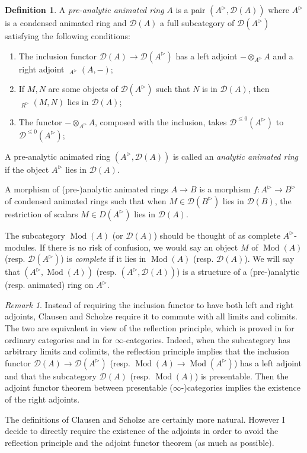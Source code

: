 \documentclass{article}
\theoremstyle{plain}
\theoremstyle{definition}
\newtheorem{defi}[thm]{Definition}
\theoremstyle{remark}
\newtheorem{rmk}[thm]{Remark}
\DeclareMathOperator{\Homs}{\underline{Hom}}
\DeclareMathOperator{\rhoms}{\underline{RHom}}
\DeclareMathOperator{\modcat}{Mod}
\newcommand{\huflag}{\triangleright}
\newcommand{\D}{\mathcal{D}}
\newcommand{\resp}[1]{{\color{respcolor}(resp. #1)}}
\begin{document}
\begin{defi}
A \emph{pre-analytic animated ring} $ A $ is a pair $ (A ^{\huflag}, \D(A)) $ where $ A ^{\huflag} $ is a condensed animated ring and
$ \D (A) $ a full subcategory of $ \D (A ^{\huflag}) $ satisfying the following conditions:

\begin{enumerate}
\item The inclusion functor $ \D (A)\to \D (A ^{\huflag}) $ has a left adjoint $ -\otimes _{A ^{\huflag}} A $
and a right adjoint $ \Homs _{A ^{\huflag}}(A, -) $;
\item If $ M,N $ are some objects of $ \D (A ^{\huflag}) $ such that $ N $ is in $\D (A) $, then $ \rhoms _{R ^{\huflag}} (M, N) $ lies in $ \D (A) $;
\item The functor $ -\otimes _{A ^{\huflag}} A $, composed with the inclusion, takes $ \D ^{\leq 0}(A ^{\huflag}) $ to $ \D ^{\leq 0}(A ^{\huflag}) $;
\end{enumerate}
A pre-analytic animated ring $ (A ^{\huflag}, \D (A)) $ is called an \emph{analytic animated ring} if
the object $ A ^{\huflag} $ lies in $ \D (A) $.

A morphism of (pre-)analytic animated rings $ A\to B $ is a morphism $ f: A ^{\huflag}\to B ^{\huflag} $ of condensed animated rings such that when
$ M\in \D (B ^{\huflag}) $ lies in $ \D (B) $, the restriction of scalars $ M \in D (A ^{\huflag}) $ lies in $ \D (A) $.
\end{defi}

The subcategory $ \modcat (A) $ (or $ \D (A) $) should be thought of as complete $ A ^{\huflag} $-modules.
If there is no risk of confusion, we would say an object $ M $ of $ \modcat (A) $ \resp{$ \D (A ^{\huflag}) $} is
\emph{complete} if it lies in $ \modcat (A) $ \resp{$\D (A) $}.
We will say that $ (A ^{\huflag}, \modcat (A)) $ \resp{$ (A ^{\huflag}, \D (A)) $} is a structure of a (pre-)analytic \resp{animated} ring on $ A ^{\huflag} $.

\begin{rmk}
\label{definition::nonsense}
Instead of requiring the inclusion functor to have both left and right adjoints,
Clausen and Scholze require it to commute with all limits and colimits.
The two are equivalent in view of the reflection principle,
which is proved in \cite{adamek_reflections_1989} for ordinary categories and in \cite{ragimov_infty-categorical_2022} for $ \infty $-categories.
Indeed, when the subcategory has arbitrary limits and colimits,
the reflection principle implies that the inclusion functor $ \D (A)\to \D (A ^{\huflag}) $ \resp{$ \modcat (A)\to \modcat (A ^{\huflag}) $}
has a left adjoint and that the subcategory
$ \D (A) $ \resp{$ \modcat (A) $} is presentable.
Then the adjoint functor theorem between presentable ($ \infty $-)categories implies the existence of the right adjoints.

The definitions of Clausen and Scholze are certainly more natural.
However I decide to directly require the existence of the adjoints in order to avoid the reflection principle and the adjoint functor theorem
(as much as possible).
\end{rmk}
\end{document}
